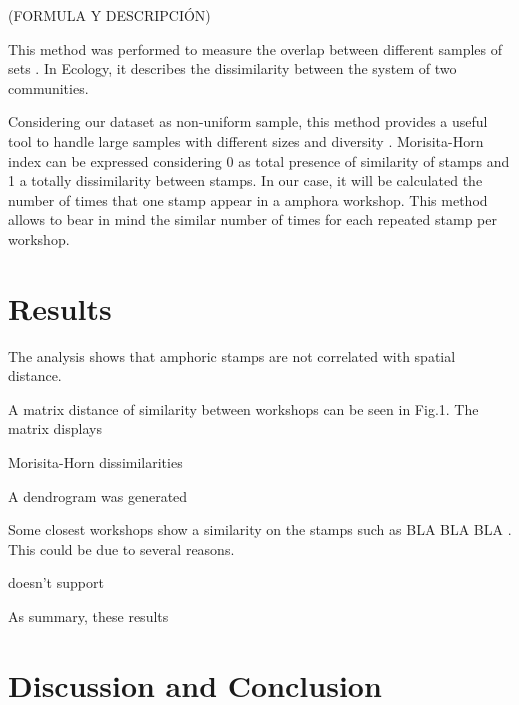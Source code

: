 \documentclass[review]{elsarticle}
\begin{document}
(FORMULA Y DESCRIPCIÓN)


This method was performed to measure the overlap between different samples of sets \citep{morisita_measuring_1959, horn_measurement_1966}. In Ecology, it describes the dissimilarity between the system of two communities. 

Considering our dataset as non-uniform sample, this method provides a useful tool to handle large samples with different sizes and diversity \citep{wolda_similarity_1981}. Morisita-Horn index can be expressed considering 0 as total presence of similarity of stamps and 1 a totally dissimilarity between stamps. In our case, it will be calculated the number of times that one stamp appear in a amphora workshop. This method allows to bear in mind the similar number of times for each repeated stamp per workshop. 


\section{Results}

The analysis shows that amphoric stamps are not correlated with spatial distance. 



A matrix distance of similarity between workshops can be seen in Fig.1. The matrix displays

Morisita-Horn dissimilarities

A dendrogram was generated 

Some closest workshops show a similarity on the stamps such as BLA BLA BLA . This could be due to several reasons. 

doesn't support


As summary, these results




\section{Discussion and Conclusion}
\end{document}
